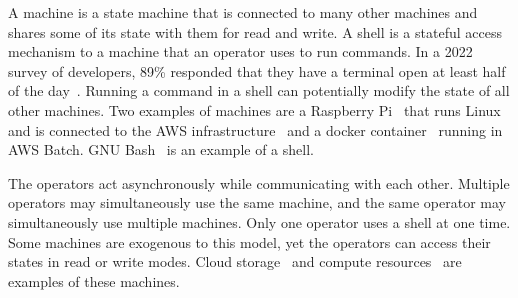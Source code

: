 A machine is a state machine that is connected to many other machines and shares some of its state with them for read and write. A shell is a stateful access mechanism to a machine that an operator uses to run commands. In a 2022 survey of developers, 89\% responded that they have a terminal open at least half of the day~\cite{textualize_founded}. Running a command in a shell can potentially modify the state of all other machines. Two examples of machines are a Raspberry Pi~\cite{rpi} that runs Linux and is connected to the AWS infrastructure~\cite{aws} and a docker container~\cite{docker} running in AWS Batch. GNU Bash~\cite{gnu_bash} is an example of a shell.

The operators act asynchronously while communicating with each other. Multiple operators may simultaneously use the same machine, and the same operator may simultaneously use multiple machines. Only one operator uses a shell at one time. Some machines are exogenous to this model, yet the operators can access their states in read or write modes. Cloud storage~\cite{aws_s3} and compute resources~\cite{aws_batch} are examples of these machines.